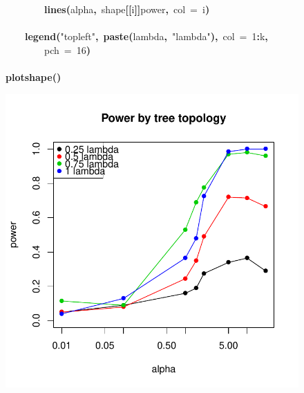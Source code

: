 \documentclass{elsarticle}
\makeatletter
\newcommand{\hlnumber}[1]{\textcolor[rgb]{0,0,0}{#1}}%
\newcommand{\hlfunctioncall}[1]{\textcolor[rgb]{.5,0,.33}{\textbf{#1}}}%
\newcommand{\hlstring}[1]{\textcolor[rgb]{.6,.6,1}{#1}}%
\newcommand{\hlkeyword}[1]{\textbf{#1}}%
\newcommand{\hlargument}[1]{\textcolor[rgb]{.69,.25,.02}{#1}}%
\newcommand{\hlsymbol}[1]{#1}%
\newcommand{\hlstd}[1]{\textcolor[rgb]{0,0,0}{#1}}%
\newenvironment{kframe}{%
 \def\FrameCommand##1{\hskip\@totalleftmargin \hskip-\fboxsep
 \colorbox{shadecolor}{##1}\hskip-\fboxsep
     \hskip-\linewidth \hskip-\@totalleftmargin \hskip\columnwidth}%
 \MakeFramed {\advance\hsize-\width
   \@totalleftmargin\z@ \linewidth\hsize
   \@setminipage}}%
 {\par\unskip\endMakeFramed}
\newenvironment{knitrout}{}{} %
\makeatother
\begin{document}
\begin{figure}
\begin{center}
\begin{knitrout}
\begin{kframe}
\begin{flushleft}
\hlstd{}{\ }{\ }{\ }{\ }{\ }{\ }{\ }{\ }\hlfunctioncall{lines}\hlkeyword{(}\hlsymbol{alpha}\hlkeyword{,}{\ }\hlsymbol{shape}\hlkeyword{[[}\hlsymbol{i}\hlkeyword{]}\hlkeyword{]}\hlkeyword{\usebox{\hlnormalsizeboxdollar}}\hlsymbol{power}\hlkeyword{,}{\ }\hlargument{col}{\ }\hlargument{=}{\ }\hlsymbol{i}\hlkeyword{)}\hspace*{\fill}\\
\hlstd{}{\ }{\ }{\ }{\ }\hlkeyword{\usebox{\hlnormalsizeboxclosebrace}}\hspace*{\fill}\\
\hlstd{}{\ }{\ }{\ }{\ }\hlfunctioncall{legend}\hlkeyword{(}\hlstring{"{}topleft"{}}\hlkeyword{,}{\ }\hlfunctioncall{paste}\hlkeyword{(}\hlsymbol{lambda}\hlkeyword{,}{\ }\hlstring{"{}lambda"{}}\hlkeyword{)}\hlkeyword{,}{\ }\hlargument{col}{\ }\hlargument{=}{\ }\hlnumber{1}\hlkeyword{:}\hlsymbol{k}\hlkeyword{,}\hspace*{\fill}\\
\hlstd{}{\ }{\ }{\ }{\ }{\ }{\ }{\ }{\ }\hlargument{pch}{\ }\hlargument{=}{\ }\hlnumber{16}\hlkeyword{)}\hspace*{\fill}\\
\hlstd{}\hlkeyword{\usebox{\hlnormalsizeboxclosebrace}}\hspace*{\fill}\\
\hlstd{}\hlfunctioncall{plot\usebox{\hlnormalsizeboxunderscore}shape}\hlkeyword{(}\hlkeyword{)}\mbox{}
\normalfont
\end{flushleft}


{\centering \includegraphics{Fig6b} 

}

\end{kframe}
\end{knitrout}

\end{center}
\label{fig:sixb}
\end{figure}
\end{document}
